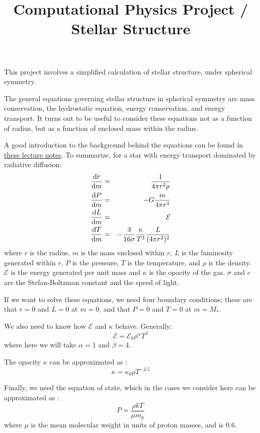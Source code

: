 \documentclass[11pt, preprint]{aastex}
\begin{document}
\title{\bf Computational Physics Project / Stellar Structure}

This project involves a simplified calculation of stellar structure,
under spherical symmetry.

The general equations governing stellar structure in spherical
symmetry are mass conservation, the hydrostatic equation, energy
conservation, and energy transport. It turns out to be useful to
consider these equations not as a function of radius, but as a
function of enclosed mass within the radius.

A good introduction to the background behind the equations can be
found in
\href{http://www.ast.cam.ac.uk/~pettini/STARS/Lecture09.pdf}{\color{blue}
  these lecture notes}. To summarize, for a star with energy transport
dominated by radiative diffusion:
\begin{eqnarray}
\frac{{\rm d}r}{{\rm d}m} &=& \frac{1}{4\pi r^2 \rho} \cr
\frac{{\rm d}P}{{\rm d}m} &=& -G \frac{m}{4\pi r^4} \cr
\frac{{\rm d}L}{{\rm d}m} &=& \mathcal{E} \cr
\frac{{\rm d}T}{{\rm d}m} &=& - \frac{3}{16 \sigma } \frac{\kappa}{T^3}
\frac{L}{(4\pi r^2)^2}
\end{eqnarray}
where $r$ is the radius, $m$ is the mass enclosed within $r$, $L$ is
the luminosity generated within $r$, $P$ is the pressure, $T$ is the
temperature, and $\rho$ is the density. $\mathcal{E}$ is the energy
generated per unit mass and $\kappa$ is the opacity of the
gas. $\sigma$ and $c$ are the Stefan-Boltzman constant and the speed
of light.

If we want to solve these equations, we need four boundary conditions;
these are that $r=0$ and $L=0$ at $m=0$, and that $P=0$ and $T=0$ at
$m=M_\ast$.

We also need to know how $\mathcal{E}$ and $\kappa$ behave. Generally:
\begin{equation}
\mathcal{E} = \mathcal{E}_0 \rho^\alpha  T^\beta
\end{equation}
where here we will take $\alpha=1$ and $\beta = 4$. 

The opacity $\kappa$ can be approximated as :
\begin{equation}
\kappa = \kappa_0 \rho T^{-3.5}
\end{equation}

Finally, we need the equation of state, which in the cases we consider
here can be approximated as :
\begin{equation}
P = \frac{\rho kT}{\mu m_p}
\end{equation}
where $\mu$ is the mean molecular weight in units of proton masses,
and is 0.6.
\end{document}
